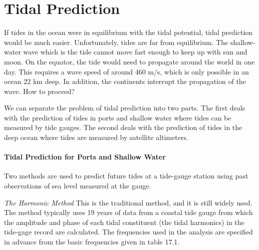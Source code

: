 \section{Tidal Prediction}
If tides in the ocean were in equilibrium with
the tidal potential, tidal prediction would be much
easier. Unfortunately, tides are far from equilibrium. The
shallow-water wave which is the tide cannot move fast enough to keep
up with sun and moon. On the equator, the tide would need to propagate
around the world in one day. This requires a wave speed of around 460
m/s, which is only possible in an ocean 22 km deep. In addition, the
continents interrupt the propagation of the wave. How to proceed?

We can separate the problem of tidal prediction into two parts. The
first deals with the prediction of tides in ports and shallow water
where tides can be measured by tide gauges. The second deals with the
prediction of tides in the deep ocean where tides are measured by
satellite altimeters.

\paragraph{Tidal Prediction for Ports and Shallow Water}
Two methods are used to predict
future tides at a tide-gauge station using past observations of sea
level measured at the gauge.

\textit{The Harmonic Method} This is the traditional method, and it is
still widely used. The
method typically uses 19 years of data from a coastal tide gauge from
which the amplitude and phase of each tidal constituent (the tidal
harmonics) in the tide-gage record are calculated. The frequencies
used in the analysis are specified in advance from the basic
frequencies given in table 17.1.

